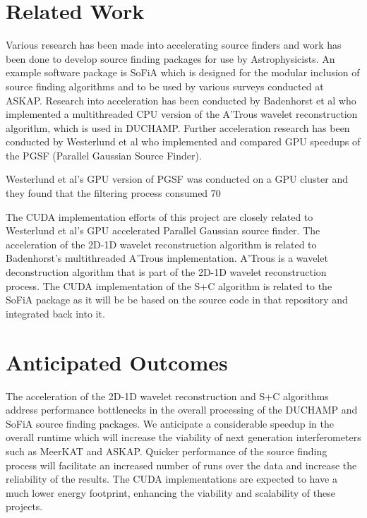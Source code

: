 \documentclass[prodmode,acmtecs]{acmsmall} \usepackage[ruled]{algorithm2e}
\begin{document}
\section{Related Work}

Various research has been made into accelerating source finders and work has been done to develop source finding packages for use by Astrophysicists. An example software package is SoFiA which is designed for the modular inclusion of source finding algorithms and to be used by various surveys conducted at ASKAP. Research into acceleration has been conducted by Badenhorst et al who implemented a multithreaded CPU version of the A’Trous wavelet reconstruction algorithm, which is used in
DUCHAMP. Further acceleration research has been conducted by Westerlund et al who implemented and compared GPU speedups of the PGSF (Parallel Gaussian Source Finder). 
 
Westerlund et al’s GPU version of PGSF was conducted on a GPU cluster and they found that the filtering process consumed 70%


The CUDA implementation efforts of this project are closely related to Westerlund et al’s GPU accelerated Parallel Gaussian source finder. The acceleration of the 2D-1D wavelet reconstruction algorithm is related to Badenhorst’s \cite{scott} multithreaded A’Trous implementation. A’Trous is a wavelet deconstruction algorithm that is part of the 2D-1D wavelet reconstruction process. The CUDA implementation of the S+C algorithm is related to the SoFiA package as it will be be based on the source code
in that repository and integrated back into it.

\section{Anticipated Outcomes}

The acceleration of the 2D-1D wavelet reconstruction and S+C algorithms address performance bottlenecks in the overall processing of the DUCHAMP and SoFiA source finding packages. We anticipate a considerable speedup in the overall runtime which will increase the viability of next generation interferometers such as MeerKAT and ASKAP. Quicker performance of the source finding process will facilitate an increased number of runs over the data and increase the reliability of the results. The
CUDA implementations are expected to have a much lower energy footprint, enhancing the viability and scalability of these projects.
\end{document}
